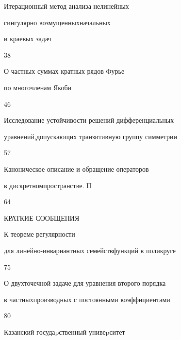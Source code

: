 

{Итерационный метод анализа нелинейных 


сингулярно возмущенных\newline начальных 


и краевых задач}{38}




{О частных суммах кратных рядов Фурье 


по многочленам Якоби}{46}




{Исследование устойчивости решений дифференциальных


уравнений,\newline допускающих транзитивную группу симметрии}{57}




{Каноническое описание и обращение операторов 


в дискретном\newline пространстве. II}{64}





\bigskip


\par


\centerline{КРАТКИЕ СООБЩЕНИЯ}


\bigskip







{К теореме регулярности 


для линейно-инвариантных семейств\newline функций в поликруге}{75}




{О двухточечной задаче для уравнения второго порядка 


в частных\newline производных с постоянными коэффициентами}{80}








\vfill


\noindent\raisebox{2pt}{\copyright} Казанский госудаpственный унивеpситет





